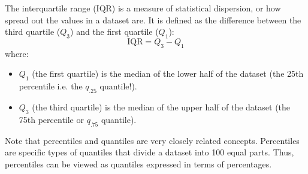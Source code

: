 \begin{definition}
    The interquartile range (IQR) is a measure of statistical dispersion, or how spread out the values in a dataset are. It is defined as the difference between the third quartile ($Q_3$) and the first quartile ($Q_1$):
    $$\text{IQR} = Q_3 - Q_1$$
    where:
    \begin{itemize}
        \item $Q_1$ (the first quartile) is the median of the lower half of the dataset (the 25th percentile i.e. the $q_{.25}$ quantile!).
        \item $Q_3$ (the third quartile) is the median of the upper half of the dataset (the 75th percentile or $q_{.75}$ quantile).
    \end{itemize}
\end{definition}

Note that percentiles and quantiles are very closely related concepts. Percentiles are specific types of quantiles that divide a dataset into 100 equal parts. Thus, 
percentiles can be viewed as quantiles expressed in terms of percentages.